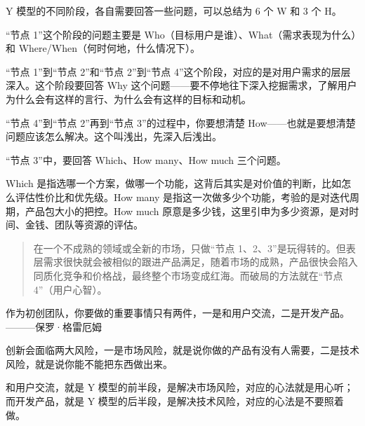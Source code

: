 \documentclass[letterpaper,11pt,english]{sphinxmanual}
\begin{document}
Y 模型的不同阶段，各自需要回答一些问题，可以总结为 6 个 W 和 3 个 H。

“节点 1”这个阶段的问题主要是
Who（目标用户是谁）、What（需求表现为什么）和
Where/When（何时何地，什么情况下）。

“节点 1”到“节点 2”和“节点 2”到“节点
4”这个阶段，对应的是对用户需求的层层深入。这个阶段要回答 Why
这个问题——要不停地往下深入挖掘需求，了解用户为什么会有这样的言行、为什么会有这样的目标和动机。

“节点 4”到“节点 2”再到“节点 3”的过程中，你要想清楚
How——也就是要想清楚问题应该怎么解决。这个叫浅出，先深入后浅出。

“节点 3”中，要回答 Which、How many、How much 三个问题。

Which
是指选哪一个方案，做哪一个功能，这背后其实是对价值的判断，比如怎么评估性价比和优先级。How
many 是指这一次做多少个功能，考验的是对迭代周期，产品包大小的把控。How
much
原意是多少钱，这里引申为多少资源，是对时间、金钱、团队等资源的评估。
\begin{quote}

在一个不成熟的领域或全新的市场，只做“节点
1、2、3”是玩得转的。但表层需求很快就会被相似的跟进产品满足，随着市场的成熟，产品很快会陷入同质化竞争和价格战，最终整个市场变成红海。而破局的方法就在“节点
4”（用户心智）。
\end{quote}

作为初创团队，你要做的重要事情只有两件，一是和用户交流，二是开发产品。
———保罗·格雷厄姆

创新会面临两大风险，一是市场风险，就是说你做的产品有没有人需要，二是技术风险，就是说你能不能把东西做出来。

和用户交流，就是 Y
模型的前半段，是解决市场风险，对应的心法就是用心听；而开发产品，就是 Y
模型的后半段，是解决技术风险，对应的心法是不要照着做。
\end{document}
